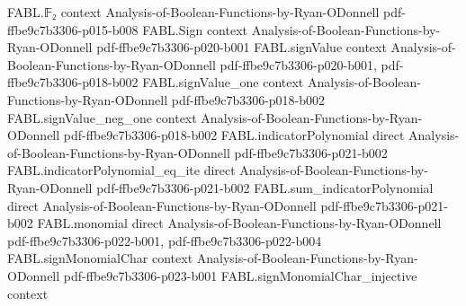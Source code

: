 \begin{theorem}
\label{FABL.relativeHammingDist_sparseFourierHypothesis_of_coefficients_le}
\leanok
{}
\proofstep
  {FABL.𝔽₂}
  {context}
  {Analysis-of-Boolean-Functions-by-Ryan-ODonnell}
  {pdf-ffbe9c7b3306-p015-b008}
\proofstep
  {FABL.Sign}
  {context}
  {Analysis-of-Boolean-Functions-by-Ryan-ODonnell}
  {pdf-ffbe9c7b3306-p020-b001}
\proofstep
  {FABL.signValue}
  {context}
  {Analysis-of-Boolean-Functions-by-Ryan-ODonnell}
  {pdf-ffbe9c7b3306-p020-b001,
    pdf-ffbe9c7b3306-p018-b002}
\proofstep
  {FABL.signValue_one}
  {context}
  {Analysis-of-Boolean-Functions-by-Ryan-ODonnell}
  {pdf-ffbe9c7b3306-p018-b002}
\proofstep
  {FABL.signValue_neg_one}
  {context}
  {Analysis-of-Boolean-Functions-by-Ryan-ODonnell}
  {pdf-ffbe9c7b3306-p018-b002}
\proofstep
  {FABL.indicatorPolynomial}
  {direct}
  {Analysis-of-Boolean-Functions-by-Ryan-ODonnell}
  {pdf-ffbe9c7b3306-p021-b002}
\proofstep
  {FABL.indicatorPolynomial_eq_ite}
  {direct}
  {Analysis-of-Boolean-Functions-by-Ryan-ODonnell}
  {pdf-ffbe9c7b3306-p021-b002}
\proofstep
  {FABL.sum_indicatorPolynomial}
  {direct}
  {Analysis-of-Boolean-Functions-by-Ryan-ODonnell}
  {pdf-ffbe9c7b3306-p021-b002}
\proofstep
  {FABL.monomial}
  {direct}
  {Analysis-of-Boolean-Functions-by-Ryan-ODonnell}
  {pdf-ffbe9c7b3306-p022-b001,
    pdf-ffbe9c7b3306-p022-b004}
\proofstep
  {FABL.signMonomialChar}
  {context}
  {Analysis-of-Boolean-Functions-by-Ryan-ODonnell}
  {pdf-ffbe9c7b3306-p023-b001}
\proofstep
  {FABL.signMonomialChar_injective}
  {context}

\end{theorem}
